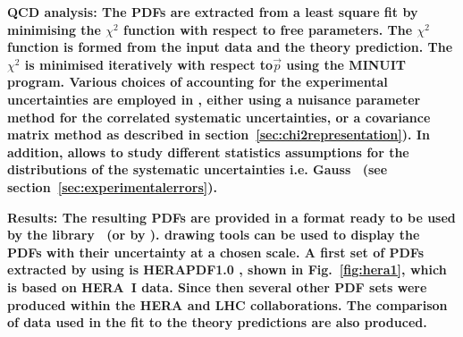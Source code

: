 \begin{description}
\item
\bf{QCD analysis:} \rm  The PDFs are extracted from a least square fit by minimising the  $\chi^2$ function with respect to free parameters. The $\chi^2$ function is formed from the input data and the theory prediction.
The $\chi^2$ is  minimised iteratively 
with respect to$\vec{p}$ using the MINUIT~\cite{minuit} program.
Various choices of accounting for the experimental uncertainties are employed in \fitter, either using 
a nuisance parameter method for the correlated systematic uncertainties, 
or a covariance matrix method as described in section~\ref{sec:chi2representation}). In addition, \fitter allows to study different statistics 
assumptions for the distributions of the systematic uncertainties i.e. Gauss~\cite{hera-lhc:report2009} (see section~\ref{sec:experimentalerrors}).
%
%
\item
\bf{Results:} \rm 
The resulting PDFs are provided in a format ready to be used by the \lhapdf 
library~\cite{lhapdf,lhapdfweb} (or by \tmdlib \cite{tmdlref}).
\fitter drawing tools can be used to display the PDFs with their uncertainty at a chosen scale.  
A first set of PDFs extracted by using \fitter is HERAPDF1.0 \cite{h1zeus:2009wt}, shown in Fig.~\ref{fig:hera1}, 
which is based on HERA~I data.
Since then several other PDF sets were produced within the HERA \cite{hera:grids} and LHC \cite{atlas:grids} collaborations.
The comparison of data used in the fit to the theory predictions are also produced. 

\end{description}
